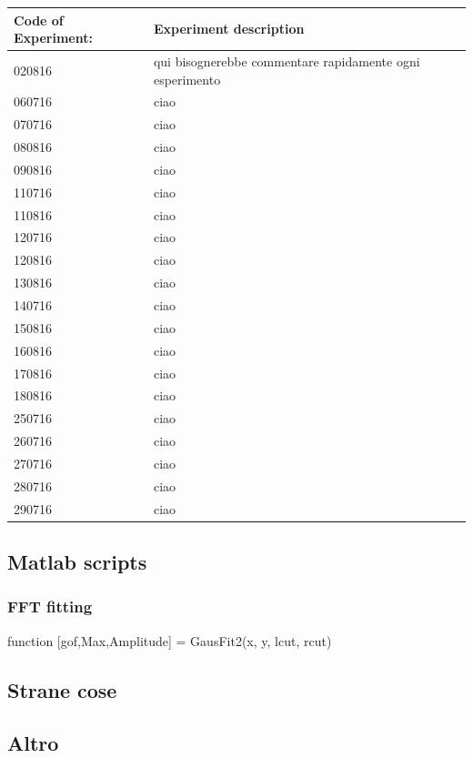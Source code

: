 \documentclass[11pt, a4paper]{article}
\begin{document}
\begin{tabular}{|l|l|}
\hline 
\textbf{Code of Experiment:} & \textbf{Experiment description}\\ 
\hline
020816 & qui bisognerebbe commentare rapidamente ogni esperimento\\
\hline
060716 & ciao\\
\hline
070716 & ciao\\
\hline
080816& ciao\\
\hline
090816& ciao\\
\hline
110716& ciao\\
\hline
110816& ciao\\
\hline
120716& ciao\\
\hline
120816& ciao\\
\hline
130816& ciao\\
\hline
140716& ciao\\
\hline
150816& ciao\\
\hline
160816& ciao\\
\hline
170816& ciao\\
\hline
180816& ciao\\
\hline
250716& ciao\\
\hline
260716& ciao\\
\hline
270716& ciao\\
\hline
280716& ciao\\
\hline
290716& ciao\\
\hline
\end{tabular}

\subsection{Matlab scripts}
\subsubsection{FFT fitting}
function [gof,Max,Amplitude] = GausFit2(x, y, lcut, rcut)


\subsection{Strane cose}%
\subsection{Altro}%




\end{document}
